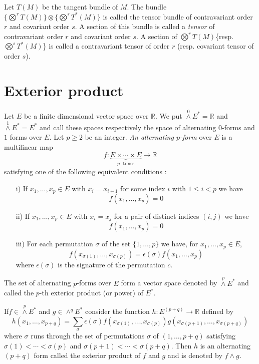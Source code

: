 Let $T(M)$ be the tangent bundle of $M$. The bundle $\{\bigotimes\limits^{r}T(M)\}\otimes \{\bigotimes\limits^{s}T^{*}(M)\}$ is called the tensor bundle of contravariant order $r$ and covariant order $s$. A section of this bundle is called a {\em tensor} of contravariant order $r$ and covariant order $s$. A section of $\bigotimes\limits^{r}T(M)$\pageoriginale \{resp. $\bigotimes\limits^{s}T^{*}(M)$\} is called a contravariant tensor of order $r$ (resp. covariant tensor of order $s$).

\section*{Exterior product}

Let $E$ be a finite dimensional vector space over $\mathbb{R}$. We put ${\displaystyle{\mathop{\wedge}\limits^{0}}}E^{*}=\mathbb{R}$ and ${\displaystyle{\mathop{\wedge}\limits^{1}}}E^{*}=E^{*}$ and call these spaces respectively the space of alternating $0$-forms and $1$ forms over $E$. Let $p\geq 2$ be an integer. {\em An alternating $p$-form} over $E$ is a multilinear map
$$
f:\underbrace{E\times \cdots \times E}_{p\text{~ times}}\to \mathbb{R}
$$
satisfying one of the following equivalent conditions :
\begin{itemize}
\item[i)] If $x_{1},\ldots,x_{p}\in E$ with $x_{i}=x_{i+1}$ for some index $i$ with $1\leq i<p$ we have
$$
f(x_{1},\ldots,x_{p})=0
$$

\item[ii)] If $x_{1},\ldots,x_{p}\in E$ with $x_{i}=x_{j}$ for a pair of distinct indices $(i,j)$ we have
$$
f(x_{1},\ldots,x_{p})=0
$$

\item[iii)] For each permutation $\sigma$ of the set $\{1,\ldots,p\}$ we have, for $x_{1},\ldots,x_{p}\in E$,
$$
f(x_{\sigma(1)},\ldots,x_{\sigma(p)})=\epsilon(\sigma)f(x_{1},\ldots,x_{p})
$$
where $\epsilon(\sigma)$ is the signature of the permutation $c$.
\end{itemize}

The set of alternating $p$-forms over $E$ form a vector space denoted by ${\displaystyle{\mathop{\wedge}\limits^{p}}}E^{*}$ and called the $p$-th exterior product (or power) of $E^{*}$.

If\pageoriginale $f\in {\displaystyle{\mathop{\wedge}\limits^{p}}} E^{*}$ and $g\in {\displaystyle{\mathop{\wedge}^{q}}}E^{*}$ consider the function $h:E^{(p+q)}\to \mathbb{R}$ defined by
$$
h(x_{1},\ldots,x_{p+q})=\sum\limits_{\sigma}\epsilon(\sigma)f(x_{\sigma(1)},\ldots,x_{\sigma(p)})g(x_{\sigma(p+1)},\ldots,x_{\sigma(p+q)})
$$
where $\sigma$ runs through the set of permutations $\sigma$ of $(1,\ldots,p+q)$ satisfying $\sigma(1)<\cdots<\sigma(p)$ and $\sigma(p+1)<\cdots<\sigma(p+q)$. Then $h$ is an alternating $(p+q)$ form called the exterior product of $f$ and $g$ and is denoted by $f\wedge g$.\label{page13}

